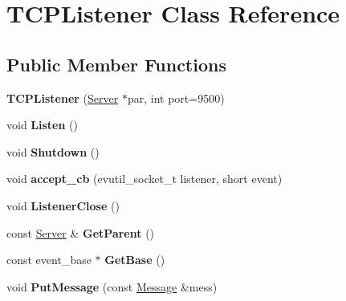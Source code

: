 \hypertarget{class_t_c_p_listener}{}\section{T\+C\+P\+Listener Class Reference}
\label{class_t_c_p_listener}
\subsection*{Public Member Functions}
\begin{DoxyCompactItemize}
\item 
\hypertarget{class_t_c_p_listener_a48b6153b937ca62a53e9c17e0b05b43d}{}{\bfseries T\+C\+P\+Listener} (\hyperlink{class_server}{Server} $\ast$par, int port=9500)\label{class_t_c_p_listener_a48b6153b937ca62a53e9c17e0b05b43d}

\item 
\hypertarget{class_t_c_p_listener_a5174b5924d90192d653d80c8ba36bed6}{}void {\bfseries Listen} ()\label{class_t_c_p_listener_a5174b5924d90192d653d80c8ba36bed6}

\item 
\hypertarget{class_t_c_p_listener_ae41a4b64b93ad9bf32ac393e274cd0a2}{}void {\bfseries Shutdown} ()\label{class_t_c_p_listener_ae41a4b64b93ad9bf32ac393e274cd0a2}

\item 
\hypertarget{class_t_c_p_listener_aa3635eb89ea270d5dbab3b9a8da07835}{}void {\bfseries accept\+\_\+cb} (evutil\+\_\+socket\+\_\+t listener, short event)\label{class_t_c_p_listener_aa3635eb89ea270d5dbab3b9a8da07835}

\item 
\hypertarget{class_t_c_p_listener_a9052d98857ad3909adb4245e3a53f17f}{}void {\bfseries Listener\+Close} ()\label{class_t_c_p_listener_a9052d98857ad3909adb4245e3a53f17f}

\item 
\hypertarget{class_t_c_p_listener_a2d5ef87aa89edb85a6e0a002ee560758}{}const \hyperlink{class_server}{Server} \& {\bfseries Get\+Parent} ()\label{class_t_c_p_listener_a2d5ef87aa89edb85a6e0a002ee560758}

\item 
\hypertarget{class_t_c_p_listener_a3ea7e57f298555e48962d97254595b37}{}const event\+\_\+base $\ast$ {\bfseries Get\+Base} ()\label{class_t_c_p_listener_a3ea7e57f298555e48962d97254595b37}

\item 
\hypertarget{class_t_c_p_listener_a630b07ccc756f5b302bb69c83b675872}{}void {\bfseries Put\+Message} (const \hyperlink{class_message}{Message} \&mess)\label{class_t_c_p_listener_a630b07ccc756f5b302bb69c83b675872}

\end{DoxyCompactItemize}
